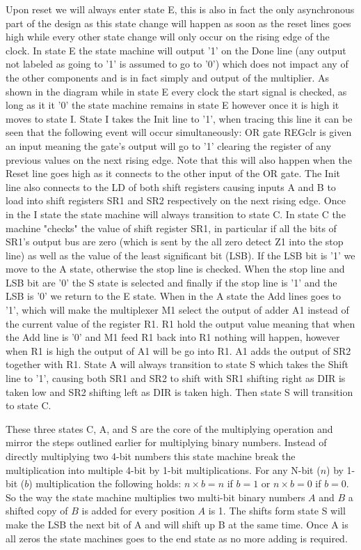 \documentclass[11pt]{article}
\begin{document}
Upon reset we will always enter state E,
this is also in fact the only asynchronous part of the design as this state change will happen as soon as the reset lines goes high while every other state change will only occur on the rising edge of the clock.
In state E the state machine will output '1' on the Done line (any output not labeled as going to '1' is assumed to go to '0') which does not impact any of the other components and is in fact simply and output of the multiplier.
As shown in the diagram while in state E every clock the start signal is checked, as long as it it '0' the state machine remains in state E however once it is high it moves to state I.
State I takes the Init line to '1', when tracing this line it can be seen that the following event will occur simultaneously: OR gate REGclr is given an input meaning the gate's output will go to '1' clearing the register of any previous values on the next rising edge.
Note that this will also happen when the Reset line goes high as it connects to the other input of the OR gate. 
The Init line also connects to the LD of both shift registers causing inputs A and B to load into shift registers SR1 and SR2 respectively on the next rising edge.
Once in the I state the state machine will always transition to state C. 
In state C the machine "checks" the value of shift register SR1,
in particular if all the bits of SR1's output bus are zero (which is sent by the all zero detect Z1 into the stop line) as well as the value of the least significant bit (LSB).
If the LSB bit is '1' we move to the A state, otherwise the stop line is checked.
When the stop line and LSB bit are '0' the S state is selected and finally if the stop line is '1' and the LSB is '0' we return to the E state.
When in the A state the Add lines goes to '1', which will make the multiplexer M1 select the output of adder A1 instead of the current value of the register R1.
R1 hold the output value meaning that when the Add line is '0' and M1 feed R1 back into R1 nothing will happen, however when R1 is high the output of A1 will be go into R1.
A1 adds the output of SR2 together with R1.
State A will always transition to state S which takes the Shift line to '1', causing both SR1 and SR2 to shift with SR1 shifting right as DIR is taken low and SR2 shifting left as DIR is taken high.
Then state S will transition to state C.

These three states C, A, and S are the core of the multiplying operation and mirror the steps outlined earlier for multiplying binary numbers.
Instead of directly multiplying two 4-bit numbers this state machine break the multiplication into multiple 4-bit by 1-bit multiplications.
For any N-bit ($n$) by 1-bit ($b$) multiplication the following holds: $n \times b = n$ if $b = 1$ or $n \times b = 0$ if $b = 0$.
So the way the state machine multiplies two multi-bit binary numbers $A$ and $B$ a shifted copy of $B$ is added for every position $A$ is 1\cite{dally}. 
The shifts form state S will make the LSB the next bit of A and will shift up B at the same time.
Once A is all zeros the state machines goes to the end state as no more adding is required. 
\end{document}

